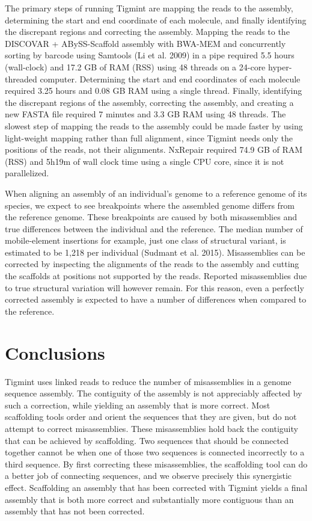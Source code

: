 \documentclass[
  12pt,
  oneside,
  openany]{book}
\begin{document}
The primary steps of running Tigmint are mapping the reads to the assembly, determining the start and end coordinate of each molecule, and finally identifying the discrepant regions and correcting the assembly. Mapping the reads to the DISCOVAR + ABySS-Scaffold assembly with BWA-MEM and concurrently sorting by barcode using Samtools (Li et al. 2009) in a pipe required 5.5 hours (wall-clock) and 17.2 GB of RAM (RSS) using 48 threads on a 24-core hyper-threaded computer. Determining the start and end coordinates of each molecule required 3.25 hours and 0.08 GB RAM using a single thread. Finally, identifying the discrepant regions of the assembly, correcting the assembly, and creating a new FASTA file required 7 minutes and 3.3 GB RAM using 48 threads. The slowest step of mapping the reads to the assembly could be made faster by using light-weight mapping rather than full alignment, since Tigmint needs only the positions of the reads, not their alignments. NxRepair required 74.9 GB of RAM (RSS) and 5h19m of wall clock time using a single CPU core, since it is not parallelized.

When aligning an assembly of an individual's genome to a reference genome of its species, we expect to see breakpoints where the assembled genome differs from the reference genome. These breakpoints are caused by both misassemblies and true differences between the individual and the reference. The median number of mobile-element insertions for example, just one class of structural variant, is estimated to be 1,218 per individual (Sudmant et al. 2015). Misassemblies can be corrected by inspecting the alignments of the reads to the assembly and cutting the scaffolds at positions not supported by the reads. Reported misassemblies due to true structural variation will however remain. For this reason, even a perfectly corrected assembly is expected to have a number of differences when compared to the reference.

\hypertarget{conclusions}{%
\section{Conclusions}\label{conclusions}}

Tigmint uses linked reads to reduce the number of misassemblies in a genome sequence assembly. The contiguity of the assembly is not appreciably affected by such a correction, while yielding an assembly that is more correct. Most scaffolding tools order and orient the sequences that they are given, but do not attempt to correct misassemblies. These misassemblies hold back the contiguity that can be achieved by scaffolding. Two sequences that should be connected together cannot be when one of those two sequences is connected incorrectly to a third sequence. By first correcting these misassemblies, the scaffolding tool can do a better job of connecting sequences, and we observe precisely this synergistic effect. Scaffolding an assembly that has been corrected with Tigmint yields a final assembly that is both more correct and substantially more contiguous than an assembly that has not been corrected.
\end{document}
